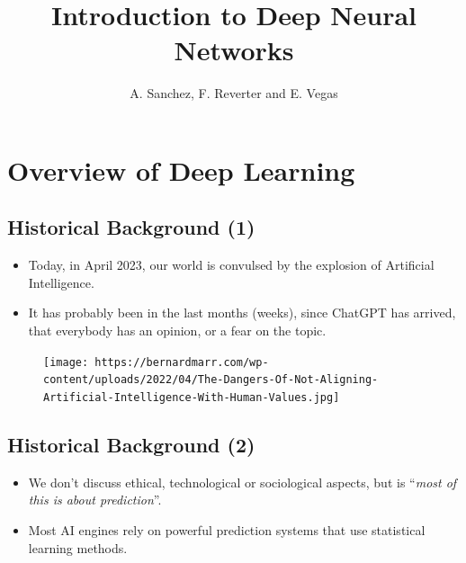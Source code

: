 \documentclass[
  letterpaper,
  DIV=11,
  numbers=noendperiod]{scrartcl}
\title{Introduction to Deep Neural Networks}
\author{A. Sanchez, F. Reverter and E. Vegas}
\date{}
\begin{document}
\maketitle
\ifdefined\Shaded\renewenvironment{Shaded}{\begin{tcolorbox}[boxrule=0pt, interior hidden, borderline west={3pt}{0pt}{shadecolor}, sharp corners, breakable, enhanced, frame hidden]}{\end{tcolorbox}}\fi

\hypertarget{overview-of-deep-learning}{%
\section{Overview of Deep Learning}\label{overview-of-deep-learning}}

\hypertarget{historical-background-1}{%
\subsection{Historical Background (1)}\label{historical-background-1}}

\begin{itemize}
\item
  Today, in April 2023, our world is convulsed by the explosion of
  Artificial Intelligence.
\item
  It has probably been in the last months (weeks), since ChatGPT has
  arrived, that everybody has an opinion, or a fear on the topic.
\end{itemize}

\begin{figure}

{\centering \texttt{[image: https://bernardmarr.com/wp-content/uploads/2022/04/The-Dangers-Of-Not-Aligning-Artificial-Intelligence-With-Human-Values.jpg]}

}

\end{figure}

\hypertarget{historical-background-2}{%
\subsection{Historical Background (2)}\label{historical-background-2}}

\begin{itemize}
\item
  We don't discuss ethical, technological or sociological aspects, but
  is ``\emph{most of this is about prediction}''.
\item
  Most AI engines rely on powerful prediction systems that use
  statistical learning methods.
\end{itemize}
\end{document}
